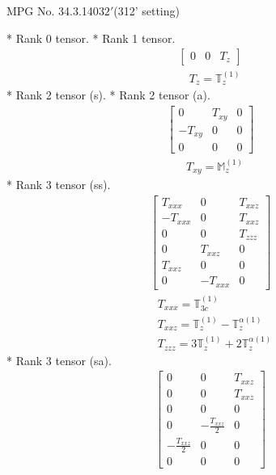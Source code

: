 \documentclass[fleqn,8pt,landscape]{jsarticle}
\begin{document}
\setcounter{MaxMatrixCols}{32}

\renewcommand{\tablename}{Table~}
\renewcommand{\figurename}{Figure~}
\begin{center}
\LARGE
MPG No. 34.3.140\quad$32'$\quad(312' setting)
\end{center}
* Rank 0 tensor.
* Rank 1 tensor.
\begin{align*}
\begin{bmatrix} 0 & 0 & T_{z} \end{bmatrix}
\end{align*}
\begin{align*}
& T_{z} = \mathbb{T}_{z}^{(1)}
\end{align*}
* Rank 2 tensor (s).
* Rank 2 tensor (a).
\begin{align*}
\begin{bmatrix} 0 & T_{xy} & 0 \\ - T_{xy} & 0 & 0 \\ 0 & 0 & 0 \end{bmatrix}
\end{align*}
\begin{align*}
& T_{xy} = \mathbb{M}_{z}^{(1)}
\end{align*}
* Rank 3 tensor (ss).
\begin{align*}
\begin{bmatrix} T_{xxx} & 0 & T_{xxz} \\ - T_{xxx} & 0 & T_{xxz} \\ 0 & 0 & T_{zzz} \\ 0 & T_{xxz} & 0 \\ T_{xxz} & 0 & 0 \\ 0 & - T_{xxx} & 0 \end{bmatrix}
\end{align*}
\begin{align*}
& T_{xxx} = \mathbb{T}_{3c}^{(1)} \\
& T_{xxz} = \mathbb{T}_{z}^{(1)} - \mathbb{T}_{z}^{\alpha(1)} \\
& T_{zzz} = 3 \mathbb{T}_{z}^{(1)} + 2 \mathbb{T}_{z}^{\alpha(1)}
\end{align*}
* Rank 3 tensor (sa).
\begin{align*}
\begin{bmatrix} 0 & 0 & T_{xxz} \\ 0 & 0 & T_{xxz} \\ 0 & 0 & 0 \\ 0 & - \frac{T_{xxz}}{2} & 0 \\ - \frac{T_{xxz}}{2} & 0 & 0 \\ 0 & 0 & 0 \end{bmatrix}
\end{align*}
\end{document}
